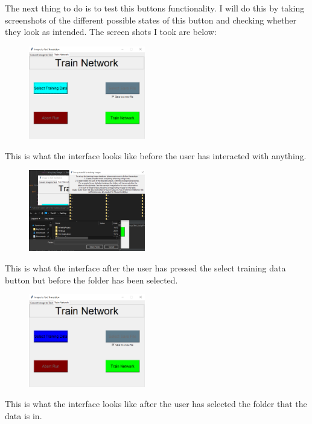 \documentclass{report}
\begin{document}
\newline
The next thing to do is to test this buttons functionality. I will do this by taking screenshots of the different possible states of this button and checking whether they look as intended. The screen shots I took are below:
\begin{figure}[H]
    \centering
    \includegraphics[width = 2in]{Images/Development and Testing/Stage 8/Select Training Data Tests/Select Training Data before user interaction.png}
\end{figure}
\noindent This is what the interface looks like before the user has interacted with anything.
\begin{figure}[H]
    \centering
    \includegraphics[width = 2in]{Images/Development and Testing/Stage 8/Select Training Data Tests/Select Training Data after being pressed.png}
\end{figure}
\noindent This is what the interface after the user has pressed the select training data button but before the folder has been selected.
\begin{figure}[H]
    \centering
    \includegraphics[width = 2in]{Images/Development and Testing/Stage 8/Select Training Data Tests/Select Training Data after folder selection.png}
\end{figure}
\noindent This is what the interface looks like after the user has selected the folder that the data is in.
\end{document}
